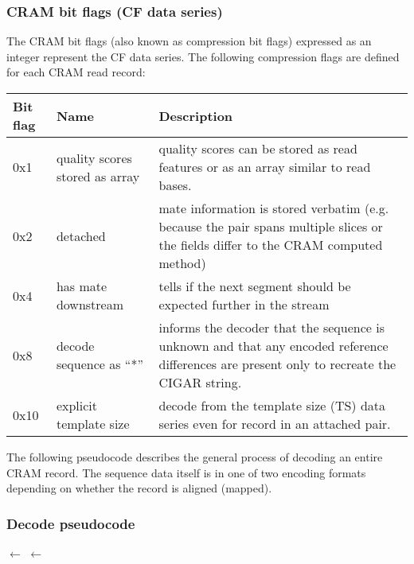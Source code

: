 \documentclass[a4paper]{article}
\begin{document}
\subsubsection*{\textbf{CRAM bit flags (CF data series)}}

The CRAM bit flags (also known as compression bit flags) expressed as an integer represent the CF data series. 
The following compression flags are defined for each CRAM read record:

\begin{tabular}{|>{\raggedright}p{39pt}|>{\raggedright}p{150pt}|>{\raggedright}p{242pt}|}
\hline
\textbf{Bit flag} & \textbf{Name} & \textbf{Description}\tabularnewline
\hline
0x1 & quality scores stored as array & quality scores can be stored as read features
or as an array similar to read bases.\tabularnewline
\hline
0x2 & detached & mate information is stored verbatim (e.g. because the pair spans multiple slices or the fields differ to the CRAM computed method)\tabularnewline
\hline
0x4 & has mate downstream & tells if the next segment should be expected further
in the stream\tabularnewline
\hline
0x8 & decode sequence as ``*'' & informs the decoder that the sequence
is unknown and that any encoded reference differences are present only to
recreate the CIGAR string.\tabularnewline
\hline
0x10 & explicit template size & decode from the template size (TS) data series even for record in an attached pair.\tabularnewline
\hline
\end{tabular}


The following pseudocode describes the general process of decoding an entire CRAM record.
The sequence data itself is in one of two encoding formats depending on whether the record is aligned (mapped).

\subsubsection*{\textbf{Decode pseudocode}}
\newlength{\maxwidth}
\newcommand{\algalign}[2] %
{\makebox[\maxwidth][l]{$#1{}$}${}#2$}

\begin{algorithmic}[1]
\settowidth{\maxwidth}{CRAM\_flags\quad}
\State \algalign{BAM\_flags}{\gets}  
\State \algalign{CRAM\_flags}{\gets} 
\State {}
\State {}
\State {}
\State {}
\Statex

  \State {}
\Else
  \State {}
\EndIf
\EndProcedure
\end{algorithmic}
\end{document}

